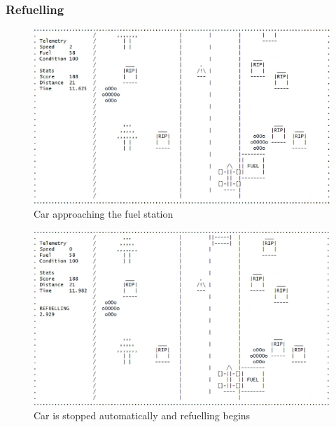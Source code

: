 \documentclass{article}
\begin{document}
\subsubsection*{Refuelling}
\begin{figure}[!ht]
	\begin{center}
	\includegraphics[width=0.63\paperwidth]{images/fuel_test_refuelapproach}
	\caption{Car approaching the fuel station}
	\label{fig:fuel_test_refuelapproach} 
	\end{center}
\end{figure}
\begin{figure}[!ht]
	\begin{center}
	\includegraphics[width=0.63\paperwidth]{images/fuel_test_refuelbegin}
	\caption{Car is stopped automatically and refuelling begins}
	\label{fig:fuel_test_refuelbegin} 
	\end{center}
\end{figure}
\newpage
\end{document}
